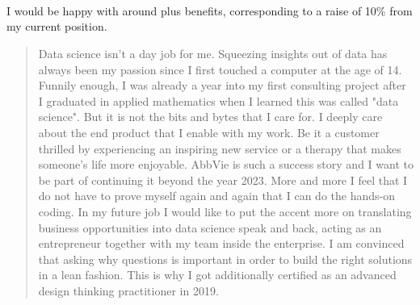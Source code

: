\documentclass[10pt,a4paper,ragged2e,withhyper]{altacv}
\begin{document}
\begin{paracol}{2}
            \\
            \smallskip
            \\
            \smallskip
            \\
            \smallskip

            I would be happy with around  plus benefits, corresponding to a raise of 10\% from my current position.


        \newpage

        \switchcolumn

            \begin{quote}
                Data science isn't a day job for me. Squeezing insights out of data has always been my passion since I first touched a computer at the age of 14. Funnily enough, I was already a year into my first consulting project after I graduated in applied mathematics when I learned this was called "data science". But it is not the bits and bytes that I care for. I deeply care about the end product that I enable with my work. Be it a customer thrilled by experiencing an inspiring new service or a therapy that makes someone's life more enjoyable. AbbVie is such a success story and I want to be part of continuing it beyond the year 2023. More and more I feel that I do not have to prove myself again and again that I can do the hands-on coding. In my future job I would like to put the accent more on translating business opportunities into data science speak and back, acting as an entrepreneur together with my team inside the enterprise. I am convinced that asking why questions is important in order to build the right solutions in a lean fashion. This is why I got additionally certified as an advanced design thinking practitioner in 2019.
            \end{quote}


\end{paracol}
\end{document}

